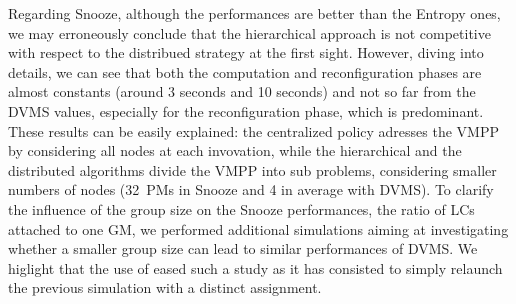 Regarding Snooze, although the performances are better than the
Entropy ones, we may erroneously conclude that the hierarchical
approach is not competitive with respect to the distribued strategy at
the first sight. However, diving into details, we can see that both
the computation and reconfiguration phases are almost constants
(around 3 seconds and 10 seconds) and not so far from the DVMS values,
especially for the reconfiguration phase, which is predominant. These
results can be easily explained: the centralized policy adresses the
VMPP by considering all nodes at each invovation, while the
hierarchical and the distributed algorithms divide the VMPP into sub
problems, considering smaller numbers of nodes (32~PMs in Snooze and
4 in average with DVMS). To clarify the influence of the group size on
the Snooze performances, \ie the ratio of LCs attached to one GM, we
performed additional simulations aiming at investigating whether a
smaller group size can lead to similar performances of DVMS. We
higlight that the use of \vmps eased such a study as it has consisted
to simply relaunch the previous simulation with a distinct
assignment.


